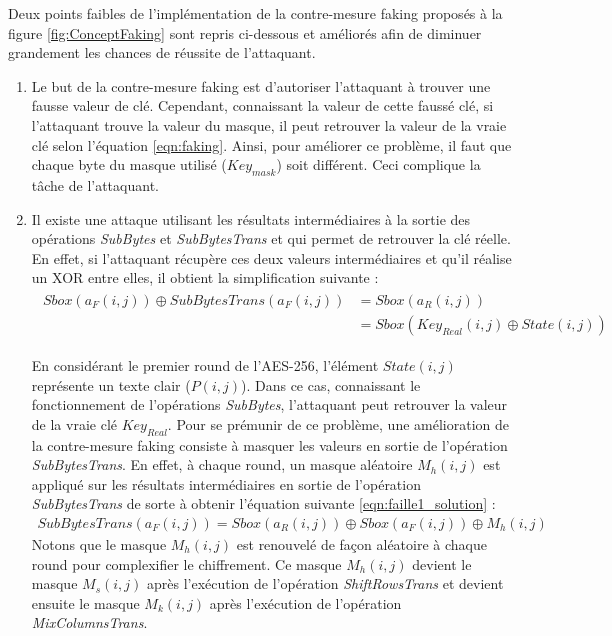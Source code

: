 \documentclass[oneside]{book}
\begin{document}
Deux points faibles de l'implémentation de la contre-mesure faking proposés à la figure \ref{fig:ConceptFaking} sont repris ci-dessous et améliorés afin de diminuer grandement les chances de réussite de l'attaquant.
\begin{enumerate}
\item Le but de la contre-mesure faking est d'autoriser l'attaquant à trouver une fausse valeur de clé. Cependant, connaissant la valeur de cette faussé clé, si l'attaquant trouve la valeur du masque, il peut retrouver la valeur de la vraie clé selon l'équation \ref{eqn:faking}. Ainsi, pour améliorer ce problème, il faut que chaque byte du masque utilisé ($Key_{mask}$) soit différent. Ceci complique la tâche de l'attaquant.
\item Il existe une attaque utilisant les résultats intermédiaires à la sortie des opérations \textit{SubBytes} et \textit{SubBytesTrans} et qui permet de retrouver la clé réelle. En effet, si l'attaquant récupère ces deux valeurs intermédiaires et qu'il réalise un XOR entre elles, il obtient la simplification suivante : 
\begin{gather}
\begin{align*}
        Sbox(a_{F}(i,j)) \oplus SubBytesTrans(a_{F}(i,j)) &= Sbox(a_{R}(i,j))  \\
            &=Sbox(Key_{Real}(i,j) \oplus State(i,j))  
\end{align*}
\label{eqn:faille1}
\end{gather}

En considérant le premier round de l'AES-256, l'élément $State(i,j)$ représente un texte clair ($P(i,j)$). Dans ce cas, connaissant le fonctionnement de l'opérations \textit{SubBytes}, l'attaquant peut retrouver la valeur de la vraie clé $Key_{Real}$. Pour se prémunir de ce problème, une amélioration de la contre-mesure faking consiste à masquer les valeurs en sortie de l'opération \textit{SubBytesTrans}. En effet, à chaque round, un masque aléatoire $M_{h}(i,j)$ est appliqué sur les résultats intermédiaires en sortie de l'opération \textit{SubBytesTrans} de sorte à obtenir l'équation suivante \ref{eqn:faille1_solution} : 
\begin{gather}
	SubBytesTrans(a_{F}(i,j)) = Sbox(a_{R}(i,j))  \oplus Sbox(a_{F}(i,j)) \oplus M_{h}(i,j) \label{eqn:faille1_solution}
\end{gather}
Notons que le masque $M_{h}(i,j)$ est renouvelé de façon aléatoire à chaque round pour complexifier le chiffrement. Ce masque $M_{h}(i,j)$ devient le masque $M_{s}(i,j)$ après l'exécution de l'opération \textit{ShiftRowsTrans} et devient ensuite le masque $M_{k}(i,j)$ après l'exécution de l'opération \textit{MixColumnsTrans}.
\end{enumerate}
\end{document}
